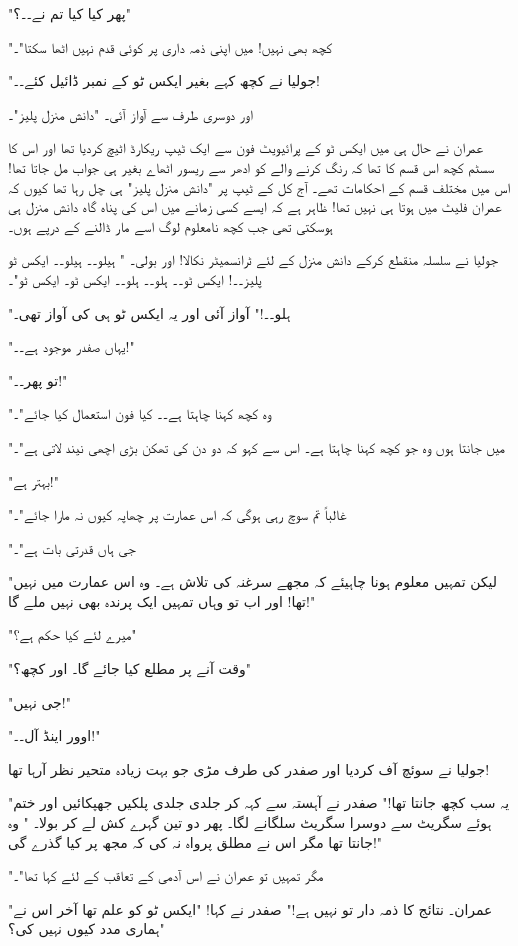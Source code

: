 "پھر کیا کیا تم نے۔۔؟"

"کچھ بھی نہیں! میں اپنی ذمہ داری پر کوئی قدم نہیں اٹھا سکتا"۔

"جولیا نے کچھ کہے بغیر ایکس ٹو کے نمبر ڈائیل کئے۔۔!

اور دوسری طرف سے آواز آئی۔ "دانش منزل پلیز"۔

عمران نے حال ہی میں ایکس ٹو کے پرائیویٹ فون سے ایک ٹیپ ریکارڈ اٹیچ کردیا تھا اور اس کا سسٹم کچھ اس قسم کا تھا کہ رنگ کرنے والے کو ادھر سے ریسور اٹھاے بغیر ہی جواب مل جاتا تھا! اس میں مختلف قسم کے احکامات تھے۔ آج کل کے ٹیپ پر "دانش منزل پلیز" ہی چل رہا تھا کیوں کہ عمران فلیٹ میں ہوتا ہی نہیں تھا! ظاہر ہے کہ ایسے کسی زمانے میں اس کی پناہ گاہ دانش منزل ہی ہوسکتی تھی جب کچھ نامعلوم لوگ اسے مار ڈالنے کے درپے ہوں۔

جولیا نے سلسلہ منقطع کرکے دانش منزل کے لئے ٹرانسمیٹر نکالا! اور بولی۔ " ہیلو۔۔ ہیلو۔۔ ایکس ٹو پلیز۔۔! ایکس ٹو۔۔ ہلو۔۔ ہلو۔۔ ایکس ٹو۔ ایکس ٹو"۔

"ہلو۔۔!" آواز آئی اور یہ ایکس ٹو ہی کی آواز تھی۔

"یہاں صفدر موجود ہے۔۔!"

"تو پھر۔۔!"

"وہ کچھ کہنا چاہتا ہے۔۔ کیا فون استعمال کیا جائے"۔

"میں جانتا ہوں وہ جو کچھ کہنا چاہتا ہے۔ اس سے کہو کہ دو دن کی تھکن بڑی اچھی نیند لاتی ہے"۔

"بہتر ہے!"

"غالباً تم سوچ رہی ہوگی کہ اس عمارت پر چھاپہ کیوں نہ مارا جائے"۔

"جی ہاں قدرتی بات ہے"۔

"لیکن تمہیں معلوم ہونا چاہیئے کہ مجھے سرغنہ کی تلاش ہے۔ وہ اس عمارت میں نہیں تھا! اور اب تو وہاں تمہیں ایک پرندہ بھی نہیں ملے گا!"

"میرے لئے کیا حکم ہے؟"

"وقت آنے پر مطلع کیا جائے گا۔ اور کچھ؟"

"جی نہیں!"

"اوور اینڈ آل۔۔!"

جولیا نے سوئچ آف کردیا اور صفدر کی طرف مڑی جو بہت زیادہ متحیر نظر آرہا تھا!

"یہ سب کچھ جانتا تھا!" صفدر نے آہستہ سے کہہ کر جلدی جلدی پلکیں جھپکائیں اور ختم ہوئے سگریٹ سے دوسرا سگریٹ سلگانے لگا۔ پھر دو تین گہرے کش لے کر بولا۔ " وہ جانتا تھا مگر اس نے مطلق پرواہ نہ کی کہ مجھ پر کیا گذرے گی!"

"مگر تمہیں تو عمران نے اس آدمی کے تعاقب کے لئے کہا تھا"۔

"عمران۔ نتائج کا ذمہ دار تو نہیں ہے!" صفدر نے کہا! "ایکس ٹو کو علم تھا آخر اس نے ہماری مدد کیوں نہیں کی؟"


